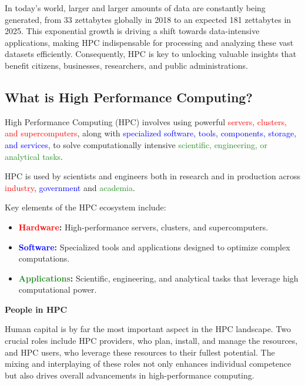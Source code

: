 \begin{observationblock}
In today’s world, larger and larger amounts of data are constantly being generated, from 33 zettabytes globally in 2018 to an expected 181 zettabytes in 2025. This exponential growth is driving a shift towards data-intensive applications, making HPC indispensable for processing and analyzing these vast datasets efficiently. Consequently, HPC is key to unlocking valuable insights that benefit citizens, businesses, researchers, and public administrations. \cite{europaHighPerformance}
\end{observationblock}

\subsection{What is High Performance Computing?} \label{sec:what_is_hpc}

High Performance Computing (HPC) involves using powerful \textcolor{red}{servers, clusters, and supercomputers}, along with \textcolor{blue}{specialized software, tools, components, storage, and services}, to solve computationally intensive \textcolor{ForestGreen}{scientific, engineering, or analytical tasks}. 

HPC is used by scientists and engineers both in research and in production across \textcolor{red}{industry}, \textcolor{blue}{government} and \textcolor{ForestGreen}{academia}.

Key elements of the HPC ecosystem include:
\begin{itemize}
    \item \textbf{\textcolor{red}{Hardware}:} High-performance servers, clusters, and supercomputers.
    \item \textbf{\textcolor{blue}{Software}:} Specialized tools and applications designed to optimize complex computations.
    \item \textbf{\textcolor{ForestGreen}{Applications}:} Scientific, engineering, and analytical tasks that leverage high computational power.
\end{itemize}

\textbf{People in HPC}

Human capital is by far the most important aspect in the HPC landscape. Two crucial roles include HPC providers, who plan, install, and manage the resources, and HPC users, who leverage these resources to their fullest potential. The mixing and interplaying of these roles not only enhances individual competence but also drives overall advancements in high-performance computing.

